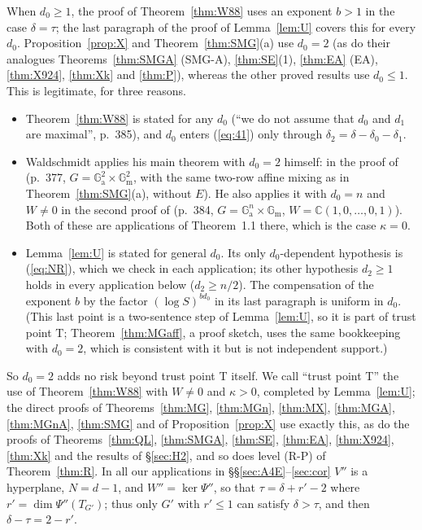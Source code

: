 \documentclass[11pt]{amsart}
\theoremstyle{definition}
\newcommand{\C}{\mathbb{C}}
\newcommand{\Ga}{\mathbb{G}_{\mathrm a}}
\newcommand{\Gm}{\mathbb{G}_{\mathrm m}}
\begin{document}
When $d_0\ge1$, the proof of Theorem~\ref{thm:W88} uses an exponent $b>1$ in the case $\delta=\tau$; the last paragraph
of the proof of Lemma~\ref{lem:U} covers this for every $d_0$. Proposition~\ref{prop:X} and Theorem~\ref{thm:SMG}(a)
use $d_0=2$ (as do their analogues Theorems~\ref{thm:SMGA} (SMG-A), \ref{thm:SE}(1), \ref{thm:EA} (EA), \ref{thm:X924},
\ref{thm:Xk} and \ref{thm:P}), whereas the other proved results use $d_0\le1$. This is legitimate, for three reasons.
\begin{itemize}
\item Theorem~\ref{thm:W88} is stated for any $d_0$ (``we do not assume that $d_0$ and $d_1$ are maximal'', p.~385), and
$d_0$ enters (\ref{eq:41}) only through $\delta_2=\delta-\delta_0-\delta_1$.
\item Waldschmidt applies his main theorem with $d_0=2$ himself: in the proof of \cite[Cor.~2.1]{W88} (p.~377,
$G=\Ga^2\times\Gm^2$, with the same two-row affine mixing as in Theorem~\ref{thm:SMG}(a), without $E$). He also applies it
with $d_0=n$ and $W\ne0$ in the second proof of \cite[Cor.~3.3]{W88} (p.~384, $G=\Ga^n\times\Gm$,
$W=\C(1,0,\dots,0,1)$). Both of these are applications of Theorem~1.1 there, which is the case $\kappa=0$.
\item Lemma~\ref{lem:U} is stated for general $d_0$. Its only $d_0$-dependent hypothesis is (\ref{eq:NR}), which we check in
each application; its other hypothesis $d_2\ge1$ holds in every application below ($d_2\ge n/2$). The compensation of the
exponent $b$ by the factor $(\log S)^{bd_0}$ in its last paragraph is uniform in $d_0$. (This last point is a two-sentence
step of Lemma~\ref{lem:U}, so it is part of trust point T; Theorem~\ref{thm:MGaff}, a proof sketch, uses the same
bookkeeping with $d_0=2$, which is consistent with it but is not independent support.)
\end{itemize}
So $d_0=2$ adds no risk beyond trust point T itself. We call ``trust point T'' the use of Theorem~\ref{thm:W88} with
$W\ne0$ and $\kappa>0$, completed by Lemma~\ref{lem:U}; the direct proofs of Theorems~\ref{thm:MG}, \ref{thm:MGn},
\ref{thm:MX}, \ref{thm:MGA}, \ref{thm:MGnA}, \ref{thm:SMG} and of Proposition~\ref{prop:X} use exactly this, as do the
proofs of Theorems~\ref{thm:QL}, \ref{thm:SMGA}, \ref{thm:SE}, \ref{thm:EA}, \ref{thm:X924}, \ref{thm:Xk} and the results of
\S\ref{sec:H2}, and so does level (R-P) of Theorem~\ref{thm:R}. In all our applications in \S\S\ref{sec:A4E}--\ref{sec:cor}
$V''$ is a hyperplane, $N=d-1$, and $W''=\ker\Psi''$, so that $\tau=\delta+r'-2$ where $r'=\dim\Psi''(T_{G'})$; thus only
$G'$ with $r'\le1$ can satisfy $\delta>\tau$, and then $\delta-\tau=2-r'$.
\end{document}

